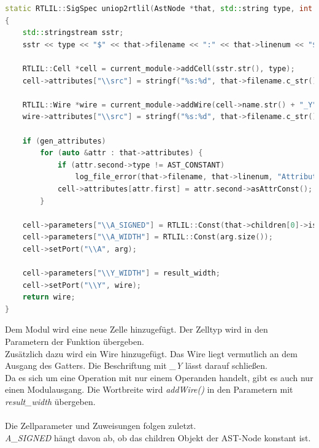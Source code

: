\documentclass[11pt]{report}
\begin{document}
\begin{lstlisting}[language=C++]
static RTLIL::SigSpec uniop2rtlil(AstNode *that, std::string type, int result_width, const RTLIL::SigSpec &arg, bool gen_attributes = true)
{
	std::stringstream sstr;
	sstr << type << "$" << that->filename << ":" << that->linenum << "$" << (autoidx++);

	RTLIL::Cell *cell = current_module->addCell(sstr.str(), type);
	cell->attributes["\\src"] = stringf("%s:%d", that->filename.c_str(), that->linenum);

	RTLIL::Wire *wire = current_module->addWire(cell->name.str() + "_Y", result_width);
	wire->attributes["\\src"] = stringf("%s:%d", that->filename.c_str(), that->linenum);

	if (gen_attributes)
		for (auto &attr : that->attributes) {
			if (attr.second->type != AST_CONSTANT)
				log_file_error(that->filename, that->linenum, "Attribute `%s' with non-constant value!\n", attr.first.c_str());
			cell->attributes[attr.first] = attr.second->asAttrConst();
		}

	cell->parameters["\\A_SIGNED"] = RTLIL::Const(that->children[0]->is_signed);
	cell->parameters["\\A_WIDTH"] = RTLIL::Const(arg.size());
	cell->setPort("\\A", arg);

	cell->parameters["\\Y_WIDTH"] = result_width;
	cell->setPort("\\Y", wire);
	return wire;
}	
\end{lstlisting}
Dem Modul wird eine neue Zelle hinzugefügt. Der Zelltyp wird in den Parametern der Funktion übergeben. \\
Zusätzlich dazu wird ein Wire hinzugefügt. Das Wire liegt vermutlich an dem Ausgang des Gatters. Die Beschriftung mit \textit{\_Y} lässt darauf schließen.\\
Da es sich um eine Operation mit nur einem Operanden handelt, gibt es auch nur einen Modulausgang. Die Wortbreite wird \textit{addWire()} in den Parametern mit \textit{result\_width} übergeben.
\\
\\
Die Zellparameter und Zuweisungen folgen zuletzt.\\
\textit{A\_SIGNED} hängt davon ab, ob das children Objekt der AST-Node konstant ist. \\
\end{document}
